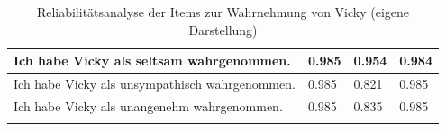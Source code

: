 \begin{longtable}{|m{8cm}|m{2cm}|m{2cm}|m{2cm}|}
     Ich habe Vicky als seltsam wahrgenommen. & 0.985& 0.954 & 0.984                    \\ \hline

     Ich habe Vicky als unsympathisch wahrgenommen. & 0.985& 0.821 & 0.985                    \\ \hline

     Ich habe Vicky als unangenehm wahrgenommen. & 0.985& 0.835 &  0.985                \\ \hline

    \caption[Reliabilitätsanalyse der Items zur Wahrnehmung von Vicky]{Reliabilitätsanalyse der Items zur Wahrnehmung von Vicky (eigene Darstellung)} 
    \label{tab:/Reliabilitätsanalyse_Wahrnehmung}
\end{longtable}
\endgroup

\pagebreak
\begingroup
\footnotesize 
